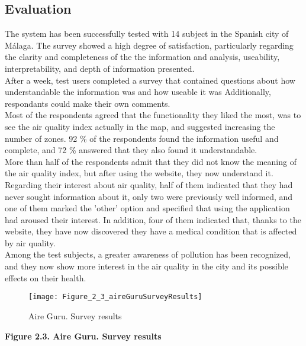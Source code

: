 \subsection*{Evaluation}

The system has been successfully tested with 14 subject in the Spanish city of Málaga.
The survey showed a high degree of satisfaction, particularly regarding the clarity and completeness of the the information and analysis,
useability, interpretability, and depth of information presented.\\

After a week, test users completed a survey that contained questions about how understandable the information was and how useable it was
Additionally, respondants could make their own comments.\\

Most of the respondents agreed that the functionality they liked the most, was to see the air quality index actually in the map, and suggested increasing the number of zones.
92 \% of the respondents found the information useful and complete, and 72 \% answered that they also found it understandable.\\

More than half of the respondents admit that they did not know the meaning of the air quality index, but after using the website, they now understand it.\\

Regarding their interest about air quality, half of them indicated that they had never sought information about it,
only two were previously well informed, and one of them marked the 'other' option and specified that using the application had aroused their interest.
In addition, four of them indicated that, thanks to the website, they have now discovered they have a medical condition that is affected by air quality.\\

Among the test subjects, a greater awareness of pollution has been recognized, and they now show more interest in the air quality in the city and its possible effects on their health.

\begin{figure}[ht]
   \centering
   \texttt{[image: Figure\_2\_3\_aireGuruSurveyResults]}
   \caption{Aire Guru. Survey results}
\end{figure}

\begin{center}
   \bf Figure 2.3. Aire Guru. Survey results\\
\end{center}